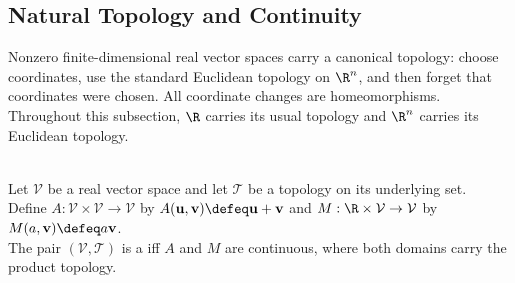 \subsection{Natural Topology and Continuity}

Nonzero finite-dimensional real vector spaces carry a canonical topology: choose coordinates, use the standard Euclidean topology on $\R^n$, and then forget that coordinates were chosen. All coordinate changes are homeomorphisms. Throughout this subsection, $\R$ carries its usual topology and $\R^n$ carries its Euclidean topology.

\begin{definition} \label{def:topological-vector-space} \\
Let $\mathcal{V}$ be a real vector space and let $\mathcal{T}$ be a topology on its underlying set.\\
Define $A:\mathcal{V}\times\mathcal{V}\to\mathcal{V}$ by $A(\mathbf{u},\mathbf{v})\defeq\mathbf{u}+\mathbf{v}$ and $M:\R\times\mathcal{V}\to\mathcal{V}$ by $M(a,\mathbf{v})\defeq a\mathbf{v}$.\\
The pair $(\mathcal{V},\mathcal{T})$ is a  iff $A$ and $M$ are continuous, where both domains carry the product topology.
\end{definition}


